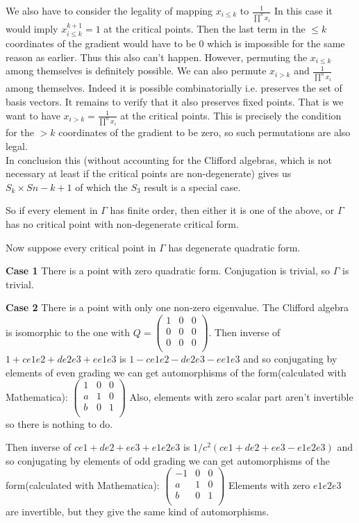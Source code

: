 \documentclass[a4paper]{article}
\begin{document}
We also have to consider the legality of mapping $x_{i\le k}$ to $\frac{1}{\prod^k x_{i}}$ In this case it would imply $x_{i\le k}^{k+1}=1$ at the critical points. Then the last term in the $\le k$ coordinates of the gradient would have to be 0 which is impossible for the same reason as earlier. Thus this also can't happen.
However, permuting the $x_{i\le k}$ among themselves is definitely possible. We can also permute $x_{i>k}$ and $\frac{1}{\prod^{n}x_{i}}$ among themselves. Indeed it is possible combinatorially i.e. preserves the set of basis vectors. It remains to verify that it also preserves fixed points. 
That is we want to have $x_{i>k}=\frac{1}{\prod^{n}x_{i}}$ at the critical points. This is precisely the condition for the $>k$ coordinates of the gradient to be zero, so such permutations are also legal.\\
In conclusion this (without accounting for the Clifford algebras, which is not necessary at least if the critical points are non-degenerate) gives us $S_{k}\times S{n-k+1}$ of which the $S_3$ result is a special case.


So if every element in $\Gamma$ has finite order, then either it is one of the above, or $\Gamma$ has no critical point with non-degenerate critical form.

Now suppose every critical point in $\Gamma$ has degenerate quadratic form.


\textbf{Case 1} There is a point with zero quadratic form.
Conjugation is trivial, so $\Gamma$ is trivial.

\textbf{Case 2} There is a point with only one non-zero eigenvalue.
The Clifford algebra is isomorphic to the one with $Q= \begin{pmatrix}
	1 & 0 &0 \\ 
	0 & 0 &0\\
	0 & 0 &0\\
\end{pmatrix}$.
Then inverse of $1+c e1e2+d e2e3+ e e1e3$ is $1-c e1e2-d e2e3- e e1e3$ and so conjugating by elements of even grading we can get automorphisms of the form(calculated with Mathematica):
$ \begin{pmatrix}
1 & 0 &0 \\ 
a & 1 & 0\\
b & 0 &  1\\
\end{pmatrix}$
Also, elements with zero scalar part aren't invertible so there is nothing to do.

Then inverse of $ce1+de2+ e e3+ e1e2e3$ is $1/c^2(ce1+de2+ e e3- e1e2e3)$ and so conjugating by elements of odd grading we can get automorphisms of the form(calculated with Mathematica):
$ \begin{pmatrix}
-1 & 0 &0 \\ 
a & 1 & 0\\
b & 0 &  1\\
\end{pmatrix}$
Elements with zero $e1e2e3$ are invertible, but they give the same kind of automorphisms.
\end{document}
